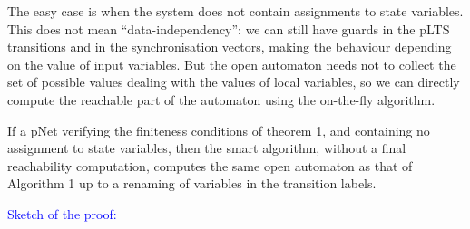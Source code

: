 \documentclass[smallcondensed]{svjour3}
\newcommand{\ERIC}[1]{\textcolor{blue}{#1}}
\begin{document}
The easy case is when the system does not contain assignments to state
variables. This does not mean ``data-independency'': we can still have
guards in the pLTS transitions and in the synchronisation vectors,
making the behaviour depending on the value of input variables. But
the open automaton needs not to collect the set of possible values dealing
with the values of local variables, so we can directly compute the
reachable part of the automaton using the on-the-fly algorithm.

\begin{theorem}
  \label{Th:CorrectnessWithoutAssignments}
If a pNet verifying the finiteness conditions of theorem 1, and
containing no assignment to state variables, then the smart  
algorithm, without a final reachability computation, computes 
the same open automaton as that of Algorithm 1 up to a renaming of
variables in the transition labels.  
  \end{theorem}

\ERIC{Sketch of the proof:}
\end{document}
